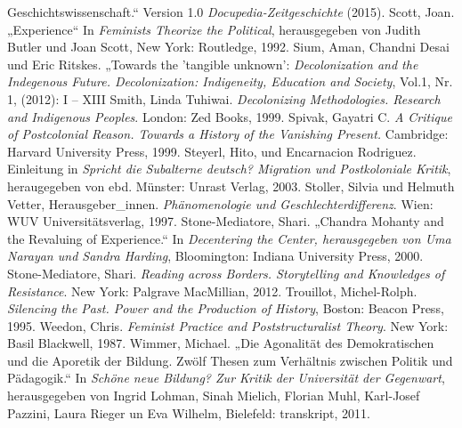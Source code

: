 \begin{thebibliography}{100}
Geschichtswissenschaft.“ Version 1.0 \emph{Docupedia-Zeitgeschichte} (2015). 
 Scott, Joan. „Experience“ In \emph{Feminists Theorize the Political}, herausgegeben von Judith Butler und Joan Scott, New York: Routledge, 1992.
 Sium, Aman, Chandni Desai und Eric Ritskes. „Towards the
'tangible unknown': \emph{Decolonization  and the Indegenous Future.
Decolonization: Indigeneity, Education and Society}, Vol.1, Nr. 1, (2012): I – XIII
 Smith, Linda Tuhiwai. \emph{Decolonizing Methodologies.
Research and Indigenous Peoples}. London: Zed Books, 1999.
 Spivak, Gayatri C. \emph{A Critique of Postcolonial Reason. Towards a History of the Vanishing Present.} Cambridge: Harvard University Press, 1999.
 Steyerl, Hito, und Encarnacion Rodriguez. Einleitung in \emph{Spricht die Subalterne deutsch? Migration und Postkoloniale Kritik}, heraugegeben von ebd. Münster: Unrast Verlag, 2003.
 Stoller, Silvia und Helmuth Vetter, Herausgeber\_innen. \emph{Phänomenologie und Geschlechterdifferenz}. Wien: WUV Universitätsverlag, 1997.
 Stone-Mediatore, Shari. „Chandra Mohanty and the Revaluing of
Experience.“ In \emph{Decentering the Center, herausgegeben von Uma Narayan und Sandra Harding}, Bloomington: Indiana University Press, 2000. 
 Stone-Mediatore, Shari. \emph{Reading across Borders. Storytelling and Knowledges of Resistance}. New York: Palgrave MacMillian, 2012.
 Trouillot, Michel-Rolph. \emph{Silencing the Past. Power and the Production of History}, Boston: Beacon Press, 1995.
 Weedon, Chris. \emph{Feminist Practice and Poststructuralist Theory}. New York: Basil Blackwell, 1987.
 Wimmer, Michael. „Die Agonalität des Demokratischen und die Aporetik der Bildung. Zwölf
Thesen zum Verhältnis zwischen Politik und Pädagogik.“ In \emph{Schöne neue
Bildung? Zur Kritik der Universität der Gegenwart}, herausgegeben von Ingrid Lohman, Sinah Mielich, Florian Muhl, Karl-Josef Pazzini, Laura Rieger un Eva Wilhelm, Bielefeld: transkript, 2011.
\end{thebibliography}
